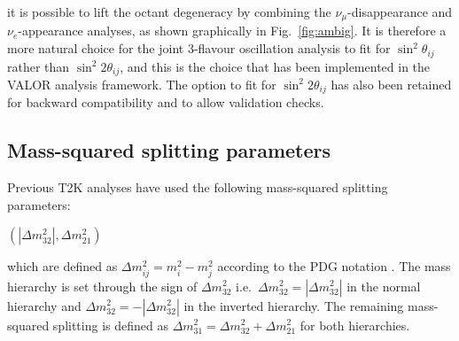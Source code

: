 \noindent
it is possible to lift the octant degeneracy by combining the $\nu_{\mu}$-disappearance and $\nu_{e}$-appearance analyses, as shown 
graphically in Fig.\ \ref{fig:ambig}. It is therefore a more natural choice for the joint 3-flavour oscillation analysis to fit for 
$\sin^{2}\theta_{ij}$ rather than $\sin^{2}2\theta_{ij}$, and this is the choice that has been implemented in the VALOR analysis framework.
The option to fit for $\sin^{2}2\theta_{ij}$ has also been retained for backward compatibility and to allow validation checks.

%
%

\subsection* {Mass-squared splitting parameters}
\label{sec:masschoice}

Previous T2K analyses have used the following mass-squared splitting parameters:
\begin{center}
$\left( |\Delta m_{32}^{2}|, \Delta m_{21}^{2} \right)$ 
\end{center}
which are defined as $\Delta m_{ij}^{2} = m_{i}^{2} - m_{j}^{2}$ according to the PDG notation \cite{PDG}. 
The mass hierarchy is set through the sign of $\Delta m_{32}^{2}$
i.e.\ $\Delta m_{32}^{2} = |\Delta m_{32}^{2}|$ in the normal hierarchy 
and $\Delta m_{32}^{2} = - |\Delta m_{32}^{2}|$ in the inverted hierarchy. 
The remaining mass-squared splitting is defined as $\Delta m_{31}^{2} = \Delta m_{32}^{2} + \Delta m_{21}^{2}$ for both hierarchies.

